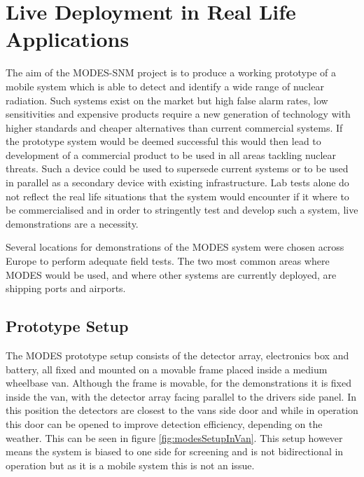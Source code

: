 \chapter{Live Deployment in Real Life Applications}


The aim of the MODES-SNM project is to produce a working prototype of a mobile system which is able to detect and identify a wide range of nuclear radiation. Such systems exist on the market but high false alarm rates, low sensitivities and expensive products require a new generation of technology with higher standards and cheaper alternatives than current commercial systems. If the prototype system would be deemed successful this would then lead to development of a commercial product to be used in all areas tackling nuclear threats. Such a device could be used to supersede current systems or to be used in parallel as a secondary device with existing infrastructure. Lab tests alone do not reflect the real life situations that the system would encounter if it where to be commercialised and in order to stringently test and develop such a system, live demonstrations are a necessity.

Several locations for demonstrations of the MODES system were chosen across Europe to perform adequate field tests. The two most common areas where MODES would be used, and where other systems are currently deployed, are shipping ports and airports. 

\section{Prototype Setup}
The MODES prototype setup consists of the detector array, electronics box and battery, all fixed and mounted on a movable frame placed inside a medium wheelbase van. Although the frame is movable, for the demonstrations it is fixed inside the van, with the detector array facing parallel to the drivers side panel. In this position the detectors are closest to the vans side door and while in operation this door can be opened to improve detection efficiency, depending on the weather. This can be seen in figure \ref{fig:modesSetupInVan}. This setup however means the system is biased to one side for screening and is not bidirectional in operation but as it is a mobile system this is not an issue.

